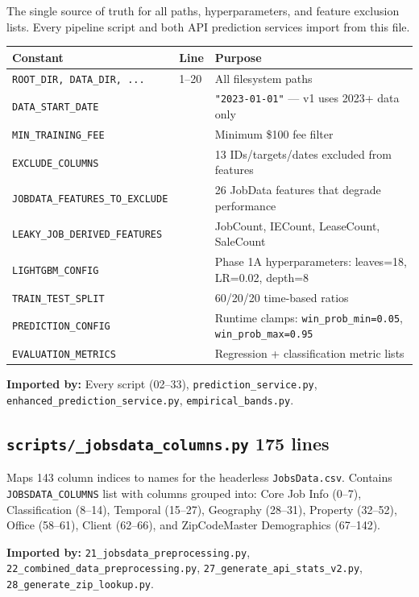 \documentclass[11pt,a4paper]{article}
\newcommand{\file}[1]{\texttt{\color{gssblue!70!black}#1}}
\newcommand{\conftag}[1]{\colorbox{configorange!15}{\small\textcolor{configorange}{\textbf{#1}}}}
\begin{document}
The single source of truth for all paths, hyperparameters, and feature exclusion lists.
Every pipeline script and both API prediction services import from this file.

\begin{longtable}{l l p{7.5cm}}
\toprule
\textbf{Constant} & \textbf{Line} & \textbf{Purpose} \\
\midrule
\endhead
\texttt{ROOT\_DIR, DATA\_DIR, ...} & 1--20 & All filesystem paths \\
\texttt{DATA\_START\_DATE} & & \texttt{"2023-01-01"} --- v1 uses 2023+ data only \\
\texttt{MIN\_TRAINING\_FEE} & & Minimum \$100 fee filter \\
\texttt{EXCLUDE\_COLUMNS} & & 13 IDs/targets/dates excluded from features \\
\texttt{JOBDATA\_FEATURES\_TO\_EXCLUDE} & & 26 JobData features that degrade performance \\
\texttt{LEAKY\_JOB\_DERIVED\_FEATURES} & & JobCount, IECount, LeaseCount, SaleCount \\
\texttt{LIGHTGBM\_CONFIG} & & Phase 1A hyperparameters: leaves=18, LR=0.02, depth=8 \\
\texttt{TRAIN\_TEST\_SPLIT} & & 60/20/20 time-based ratios \\
\texttt{PREDICTION\_CONFIG} & & Runtime clamps: \texttt{win\_prob\_min=0.05}, \texttt{win\_prob\_max=0.95} \\
\texttt{EVALUATION\_METRICS} & & Regression + classification metric lists \\
\bottomrule
\end{longtable}

\textbf{Imported by:} Every script (02--33), \file{prediction\_service.py}, \file{enhanced\_prediction\_service.py}, \file{empirical\_bands.py}.

\subsection{\file{scripts/\_jobsdata\_columns.py} \conftag{175 lines}}

Maps 143 column indices to names for the headerless \file{JobsData.csv}. Contains
\texttt{JOBSDATA\_COLUMNS} list with columns grouped into: Core Job Info (0--7),
Classification (8--14), Temporal (15--27), Geography (28--31), Property (32--52),
Office (58--61), Client (62--66), and ZipCodeMaster Demographics (67--142).

\textbf{Imported by:} \file{21\_jobsdata\_preprocessing.py}, \file{22\_combined\_data\_preprocessing.py}, \file{27\_generate\_api\_stats\_v2.py}, \file{28\_generate\_zip\_lookup.py}.
\end{document}
